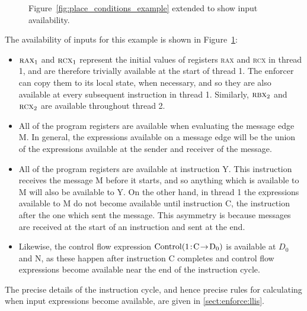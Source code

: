 \begin{figure}[t]
  \vspace{-12pt}
  \caption{Figure~\ref{fig:place_conditions_example} extended to show
    input availability.}
  \label{fig:place_conditions_example:availability}
\end{figure}

The availability of inputs for this example is shown in
Figure~\ref{fig:place_conditions_example:availability}:
\begin{itemize}
\item $\textsc{rax}_1$ and $\textsc{rcx}_1$ represent the initial
  values of registers \textsc{rax} and \textsc{rcx} in thread 1, and
  are therefore trivially available at the start of thread 1.  The
  enforcer can copy them to its local state, when necessary, and so
  they are also available at every subsequent instruction in thread 1.
  Similarly, $\textsc{rbx}_2$ and $\textsc{rcx}_2$ are available
  throughout thread 2.
\item All of the program registers are available when evaluating the
  message edge M.  In general, the expressions available on a message
  edge will be the union of the expressions available at the sender and
  receiver of the message.
\item All of the program registers are available at instruction Y.
  This instruction receives the message M before it starts, and so
  anything which is available to M will also be available to Y.  On
  the other hand, in thread 1 the expressions available to M do not
  become available until instruction C, the instruction after the one
  which sent the message.  This asymmetry is because messages are
  received at the start of an instruction and sent at the end.
\item Likewise, the control flow expression $\mathrm{Control}(\mathrm{1}\!:\!\mathrm{C}\!\rightarrow\!\mathrm{D_0})$
  is available at $D_0$ and N, as these happen after instruction C
  completes and control flow expressions become available near the end
  of the instruction cycle.
\end{itemize}
The precise details of the instruction cycle, and hence precise rules
for calculating when input expressions become available, are given in
\autoref{sect:enforce:llis}.

